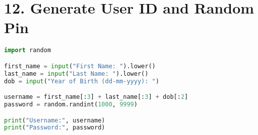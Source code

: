 \documentclass{article}
\begin{document}
\section*{12. Generate User ID and Random Pin}
\begin{lstlisting}[language=Python]
import random

first_name = input("First Name: ").lower()
last_name = input("Last Name: ").lower()
dob = input("Year of Birth (dd-mm-yyyy): ")

username = first_name[:3] + last_name[:3] + dob[:2]
password = random.randint(1000, 9999)

print("Username:", username)
print("Password:", password)
\end{lstlisting}
\end{document}
